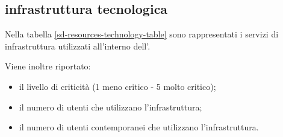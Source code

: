\subsection[Infrastruttura tecnologica]{infrastruttura tecnologica}
\label{sd-resources-technology}
Nella tabella \ref{sd-resources-technology-table} sono rappresentati i servizi di infrastruttura utilizzati all'interno dell'\entity{}.

Viene inoltre riportato:

\begin{itemize}
\item{il livello di criticità (\num{1} meno critico - \num{5} molto critico);}
\item{il numero di utenti che utilizzano l'infrastruttura;}
\item{il numero di utenti contemporanei che utilizzano l'infrastruttura.}
\end{itemize}

